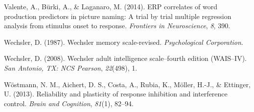 \documentclass[
  man,floatsintext]{apa6}
\newlength{\cslhangindent}
\newlength{\cslentryspacingunit} %
\newenvironment{CSLReferences}[2] %
 {%
  \setlength{\parindent}{0pt}
  \ifodd #1
  \let\oldpar\par
  \def\par{\hangindent=\cslhangindent\oldpar}
  \fi
  \setlength{\parskip}{#2\cslentryspacingunit}
 }%
 {}
\begin{document}
\begin{CSLReferences}{1}{0}
\leavevmode{}%
Valente, A., Bürki, A., \& Laganaro, M. (2014). ERP correlates of word production predictors in picture naming: A trial by trial multiple regression analysis from stimulus onset to response. \emph{Frontiers in Neuroscience}, \emph{8}, 390.

\leavevmode{}%
Wechsler, D. (1987). Wechsler memory scale-revised. \emph{Psychological Corporation}.

\leavevmode{}%
Wechsler, D. (2008). Wechsler adult intelligence scale--fourth edition (WAIS--IV). \emph{San Antonio, TX: NCS Pearson}, \emph{22}(498), 1.

\leavevmode{}%
Wöstmann, N. M., Aichert, D. S., Costa, A., Rubia, K., Möller, H.-J., \& Ettinger, U. (2013). Reliability and plasticity of response inhibition and interference control. \emph{Brain and Cognition}, \emph{81}(1), 82--94.

\end{CSLReferences}
\end{document}
